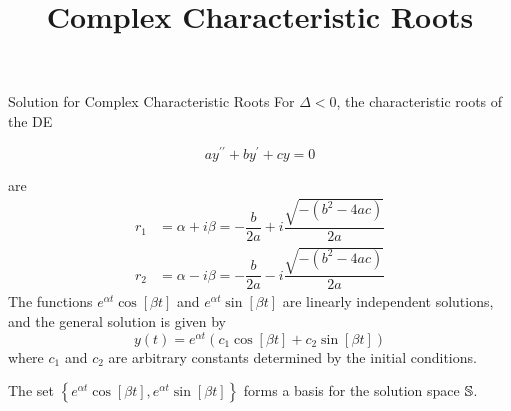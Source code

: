 \documentclass{beamer}
\title[MA245 - Section 4.3]{Complex Characteristic Roots}
\begin{document}
\begin{frame}
  \titlepage
\end{frame}

\begin{frame}
\begin{block}{Solution for Complex Characteristic Roots}
For $\Delta<0$, the characteristic roots of the DE

\vspace{-4mm}
\begin{equation*}
ay^{\prime\prime}+by^{\prime}+cy=0
\end{equation*}

\vspace{-5mm}
are
\begin{equation*}
\begin{aligned}
r_1&=\alpha+i\beta = -\dfrac{b}{2a}+i\dfrac{\sqrt{-(b^2-4ac)}}{2a}\\
r_2&=\alpha-i\beta = -\dfrac{b}{2a}-i\dfrac{\sqrt{-(b^2-4ac)}}{2a}
\end{aligned}
\end{equation*}\pause
The functions $e^{\alpha t}\cos[\beta t]$ and $e^{\alpha t}\sin[\beta t]$ are linearly independent solutions, and the general solution is given by
\begin{equation*}
y(t)=e^{\alpha t}\left(c_1\cos[\beta t]+c_2\sin[\beta t]\right)
\end{equation*}
where $c_1$ and $c_2$ are arbitrary constants determined by the initial conditions.\pause

\vspace{2mm}
The set $\left\{e^{\alpha t}\cos[\beta t],e^{\alpha t}\sin[\beta t]\right\}$ forms a basis for the solution space $\mathbb{S}$.
\end{block}
\end{frame}
\end{document}
